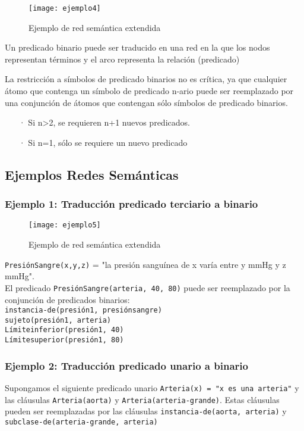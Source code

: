 \documentclass[12pt]{article}
\begin{document}
\begin{wrapfigure}{r}{0.3\textwidth}
\texttt{[image: ejemplo4]}
\caption{Ejemplo de red semántica extendida} \label{fig:ejemplo4}
\end{wrapfigure}

Un predicado binario puede ser traducido en una red en la que los nodos representan términos y el arco representa la relación (predicado)

La restricción a símbolos de predicado binarios no es crítica, ya que cualquier átomo que contenga un símbolo de predicado n-ario puede ser reemplazado por una conjunción de átomos que contengan sólo símbolos de predicado binarios.
\begin{enumerate}
\item[·] Si n>2, se requieren n+1 nuevos predicados.
\item[·] Si n=1, sólo se requiere un nuevo predicado
\end{enumerate}
\subsection{Ejemplos Redes Semánticas}
\subsubsection{Ejemplo 1: Traducción predicado terciario a binario}

\begin{wrapfigure}{r}{0.4\textwidth}
\texttt{[image: ejemplo5]}
\caption{Ejemplo de red semántica extendida} \label{fig:ejemplo5}
\end{wrapfigure}

\texttt{PresiónSangre(x,y,z)} = "la presión sanguínea de x varía entre y mmHg y z mmHg".\\
El predicado \texttt{PresiónSangre(arteria, 40, 80)} puede ser reemplazado por la conjunción de predicados binarios:\\
\texttt{instancia-de(presión1, presiónsangre)}\\
\texttt{sujeto(presión1, arteria)}\\
\texttt{Límiteinferior(presión1, 40)}\\
\texttt{Límitesuperior(presión1, 80)}\\

\subsubsection{Ejemplo 2: Traducción predicado unario a binario}
Supongamos el siguiente predicado unario \texttt{Arteria(x) = "x es una arteria"} y las cláusulas \texttt{Arteria(aorta)} y \texttt{Arteria(arteria-grande)}. Estas cláusulas pueden ser reemplazadas por las cláusulas \texttt{instancia-de(aorta, arteria)} y \texttt{subclase-de(arteria-grande, arteria)}
\end{document}
